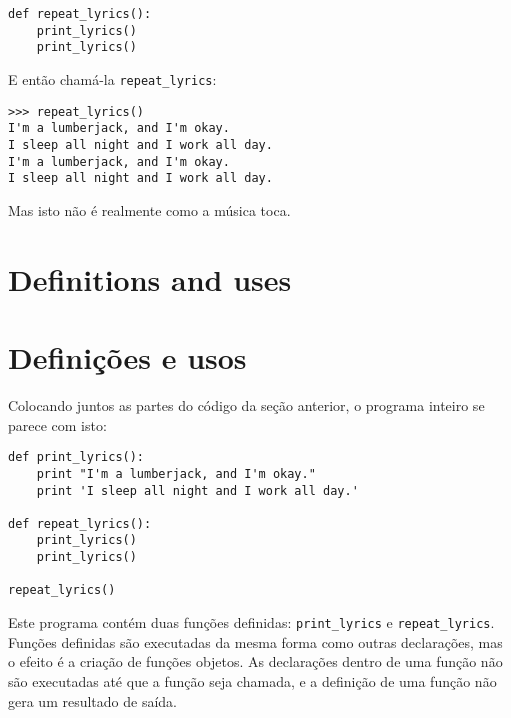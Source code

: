 \beforeverb
\begin{verbatim}
def repeat_lyrics():
    print_lyrics()
    print_lyrics()
\end{verbatim}
\afterverb

E então chamá-la \verb"repeat_lyrics":

\beforeverb
\begin{verbatim}
>>> repeat_lyrics()
I'm a lumberjack, and I'm okay.
I sleep all night and I work all day.
I'm a lumberjack, and I'm okay.
I sleep all night and I work all day.
\end{verbatim}
\afterverb
%
Mas isto não é realmente como a música toca.

\section{Definitions and uses}
\section{Definições e usos}


Colocando juntos as partes do código da seção anterior, o programa inteiro
se parece com isto:

\beforeverb
\begin{verbatim}
def print_lyrics():
    print "I'm a lumberjack, and I'm okay."
    print 'I sleep all night and I work all day.'

def repeat_lyrics():
    print_lyrics()
    print_lyrics()

repeat_lyrics()
\end{verbatim}
\afterverb
%

Este programa contém duas funções definidas: \verb"print_lyrics" e
\verb"repeat_lyrics". Funções definidas são executadas da mesma forma como
outras declarações, mas o efeito é a criação de funções objetos. As
declarações dentro de uma função não são executadas até que a função
seja chamada, e a definição de uma função não gera um resultado de saída.

